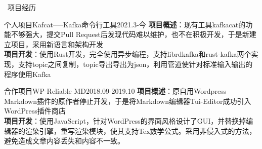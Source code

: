 \documentclass[UTF8]{resume}
\begin{document}
\begin{rSection}{\faUsers~项目经历}
    \begin{rProject}{个人项目}{Kafcat──Kafka命令行工具}{2021.3-今}
        \textbf{项目概述}：现有工具kafkacat的功能不够强大，提交Pull Request后发现代码难以维护，也不在积极开发，于是新建立项目，采用新语言和架构开发\\
        \textbf{项目开发}：使用Rust开发，完全使用异步编程，支持librdkafka和rust-kafka两个实现，支持topic之间复制，topic导出导出为json，利用管道使针对标准输入输出的程序使用Kafka
    \end{rProject}

    \begin{rProject}{合作项目}{WP-Reliable MD}{2018.09-2019.10}
        \textbf{项目概述}：原自用Wordpress Markdown插件的原作者停止开发，于是将Markdown编辑器Tui-Editor成功引入WordPress插件商店\\
        \textbf{项目开发}：使用JavaScript，针对WordPress的界面风格设计了GUI，并替换掉编辑器的渲染引擎，重写渲染模块，使其支持Tex数学公式。采用非侵入式的方法，避免造成文章内容丢失和内容不一致。
    \end{rProject}




\end{rSection}
\end{document}
